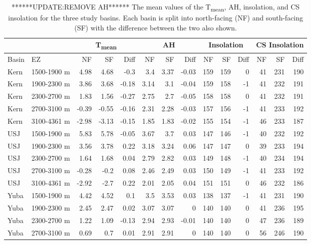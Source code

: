 \begin{table}[htbp]
\centering
\caption{******UPDATE:REMOVE AH****** The mean values of the T\textsubscript{mean}, AH, insolation, and CS insolation for the three study basins. Each basin is split into north-facing (NF) and south-facing (SF) with the difference between the two also shown.}
\label{tab:met_metric_table}
\tiny 
\begin{tabular}{llrrrrrrrrrrrr}
\toprule
& & \multicolumn{3}{c}{T\textsubscript{mean}} & \multicolumn{3}{c}{AH} & \multicolumn{3}{c}{Insolation} & \multicolumn{3}{c}{CS Insolation} \\
\midrule
Basin & EZ & NF & SF & Diff & NF & SF & Diff & NF & SF & Diff & NF & SF & Diff \\
\midrule
Kern & 1500-1900 m & 4.98 & 4.68 & -0.3 & 3.4 & 3.37 & -0.03 & 159 & 159 & 0 & 41 & 231 & 190 \\
Kern & 1900-2300 m & 3.86 & 3.68 & -0.18 & 3.14 & 3.1 & -0.04 & 159 & 158 & -1 & 41 & 232 & 191 \\
Kern & 2300-2700 m & 1.83 & 1.56 & -0.27 & 2.75 & 2.7 & -0.05 & 158 & 158 & 0 & 41 & 232 & 191 \\
Kern & 2700-3100 m & -0.39 & -0.55 & -0.16 & 2.31 & 2.28 & -0.03 & 157 & 156 & -1 & 41 & 233 & 192 \\
Kern & 3100-4361 m & -2.98 & -3.13 & -0.15 & 1.85 & 1.83 & -0.02 & 155 & 154 & -1 & 46 & 233 & 187 \\
USJ & 1500-1900 m & 5.83 & 5.78 & -0.05 & 3.67 & 3.7 & 0.03 & 147 & 146 & -1 & 40 & 232 & 192 \\
USJ & 1900-2300 m & 3.56 & 3.78 & 0.22 & 3.18 & 3.24 & 0.06 & 147 & 147 & 0 & 39 & 233 & 194 \\
USJ & 2300-2700 m & 1.64 & 1.68 & 0.04 & 2.79 & 2.82 & 0.03 & 149 & 148 & -1 & 40 & 234 & 194 \\
USJ & 2700-3100 m & -0.28 & -0.2 & 0.08 & 2.46 & 2.49 & 0.03 & 150 & 149 & -1 & 41 & 233 & 192 \\
USJ & 3100-4361 m & -2.92 & -2.7 & 0.22 & 2.01 & 2.05 & 0.04 & 151 & 151 & 0 & 46 & 232 & 186 \\
Yuba & 1500-1900 m & 4.42 & 4.52 & 0.1 & 3.5 & 3.53 & 0.03 & 138 & 137 & -1 & 41 & 231 & 190 \\
Yuba & 1900-2300 m & 2.45 & 2.47 & 0.02 & 3.07 & 3.07 & 0 & 140 & 140 & 0 & 41 & 236 & 195 \\
Yuba & 2300-2700 m & 1.22 & 1.09 & -0.13 & 2.94 & 2.93 & -0.01 & 140 & 140 & 0 & 47 & 236 & 189 \\
Yuba & 2700-3100 m & 0.69 & 0.7 & 0.01 & 2.91 & 2.91 & 0 & 140 & 140 & 0 & 56 & 246 & 190 \\
\bottomrule
\end{tabular}
\end{table}


